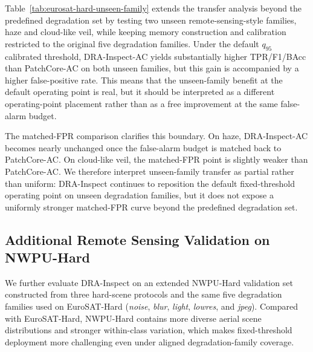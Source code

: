 \documentclass[remotesensing,article,submit,pdftex,moreauthors]{Definitions/mdpi}
\begin{document}
\noindent Table~\ref{tab:eurosat-hard-unseen-family} extends the transfer analysis beyond the predefined degradation set by testing two unseen remote-sensing-style families, haze and cloud-like veil, while keeping memory construction and calibration restricted to the original five degradation families. Under the default $q_{95}$ calibrated threshold, DRA-Inspect-AC yields substantially higher TPR/F1/BAcc than PatchCore-AC on both unseen families, but this gain is accompanied by a higher false-positive rate. This means that the unseen-family benefit at the default operating point is real, but it should be interpreted as a different operating-point placement rather than as a free improvement at the same false-alarm budget.

\noindent The matched-FPR comparison clarifies this boundary. On haze, DRA-Inspect-AC becomes nearly unchanged once the false-alarm budget is matched back to PatchCore-AC. On cloud-like veil, the matched-FPR point is slightly weaker than PatchCore-AC. We therefore interpret unseen-family transfer as partial rather than uniform: DRA-Inspect continues to reposition the default fixed-threshold operating point on unseen degradation families, but it does not expose a uniformly stronger matched-FPR curve beyond the predefined degradation set.

\subsection{Additional Remote Sensing Validation on NWPU-Hard}
We further evaluate DRA-Inspect on an extended NWPU-Hard validation set constructed from three hard-scene protocols and the same five degradation families used on EuroSAT-Hard (\textit{noise}, \textit{blur}, \textit{light}, \textit{lowres}, and \textit{jpeg}). Compared with EuroSAT-Hard, NWPU-Hard contains more diverse aerial scene distributions and stronger within-class variation, which makes fixed-threshold deployment more challenging even under aligned degradation-family coverage.
\end{document}
